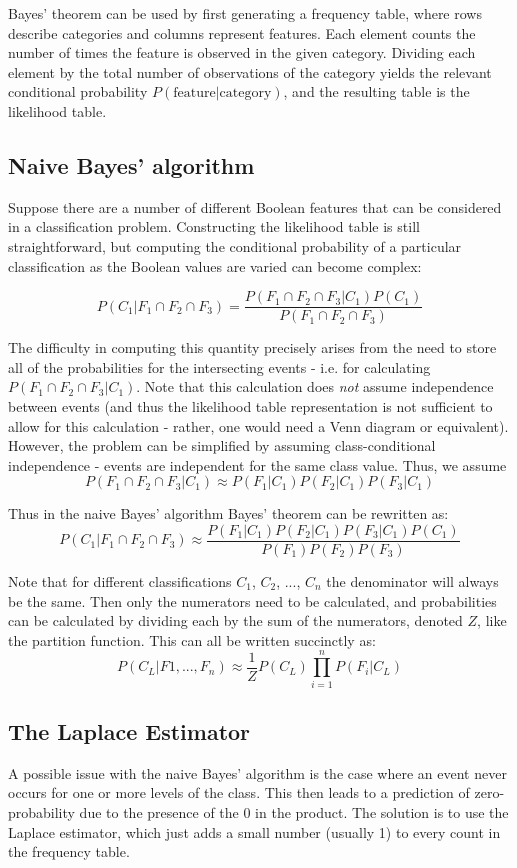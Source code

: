 \documentclass[]{article}
\begin{document}
Bayes' theorem can be used by first generating a frequency table, where rows describe categories and columns represent features.  Each element counts the number of times the feature is observed in the given category.  Dividing each element by the total number of observations of the category yields the relevant conditional probability $P(\text{feature}|\text{category})$, and the resulting table is the likelihood table.

\subsection{Naive Bayes' algorithm}

Suppose there are a number of different Boolean features that can be considered in a classification problem.  Constructing the likelihood table is still straightforward, but computing the conditional probability of a particular classification as the Boolean values are varied can become complex:

$$
P(C_1|F_1 \cap F_2 \cap F_3) = \frac{P(F_1 \cap F_2 \cap F_3|C_1)P(C_1)}{P(F_1 \cap F_2 \cap F_3)}
$$

The difficulty in computing this quantity precisely arises from the need to store all of the probabilities for the intersecting events - i.e. for calculating $P(F_1 \cap F_2 \cap F_3|C_1)$.  Note that this calculation does \emph{not} assume independence between events (and thus the likelihood table representation is not sufficient to allow for this calculation - rather, one would need a Venn diagram or equivalent).  However, the problem can be simplified by assuming class-conditional independence - events are independent for the same class value.  Thus, we assume 
$$
P(F_1 \cap F_2 \cap F_3|C_1) \approx P(F_1|C_1)P(F_2|C_1)P(F_3|C_1)
$$

Thus in the naive Bayes' algorithm Bayes' theorem can be rewritten as:
$$
P(C_1|F_1 \cap F_2 \cap F_3) \approx \frac{P(F_1|C_1)P(F_2|C_1)P(F_3|C_1)P(C_1)}{P(F_1)P(F_2)P(F_3)}
$$

Note that for different classifications $C_1$, $C_2$, ..., $C_n$ the denominator will always be the same.  Then only the numerators need to be calculated, and probabilities can be calculated by dividing each by the sum of the numerators, denoted $Z$, like the partition function.  This can all be written succinctly as:
$$
P(C_L|F1,...,F_n) \approx \frac{1}{Z}P(C_L)\prod_{i=1}^{n}P(F_i|C_L)
$$

\subsection{The Laplace Estimator}

A possible issue with the naive Bayes' algorithm is the case where an event never occurs for one or more levels of the class. This then leads to a prediction of zero-probability due to the presence of the 0 in the product. The solution is to use the Laplace estimator, which just adds a small number (usually 1) to every count in the frequency table.
\end{document}

